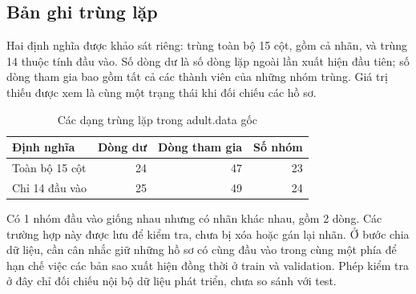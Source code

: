 \subsection{Bản ghi trùng lặp}
\label{subsec:3_3_2}
Hai định nghĩa được khảo sát riêng: trùng toàn bộ 15 cột, gồm cả nhãn, và trùng 14 thuộc tính đầu vào. Số dòng dư là số dòng lặp ngoài lần xuất hiện đầu tiên; số dòng tham gia bao gồm tất cả các thành viên của những nhóm trùng. Giá trị thiếu được xem là cùng một trạng thái khi đối chiếu các hồ sơ.

\begin{table}[htbp]
\centering
\small
\caption{Các dạng trùng lặp trong adult.data gốc}\label{tab:duplicates-train}
\begin{tabular}{lrrr}
\toprule
Định nghĩa & Dòng dư & Dòng tham gia & Số nhóm \\
\midrule
Toàn bộ 15 cột & 24 & 47 & 23 \\
Chỉ 14 đầu vào & 25 & 49 & 24 \\
\bottomrule
\end{tabular}
\end{table}

Có 1 nhóm đầu vào giống nhau nhưng có nhãn khác nhau, gồm 2 dòng. Các trường hợp này được lưu để kiểm tra, chưa bị xóa hoặc gán lại nhãn. Ở bước chia dữ liệu, cần cân nhắc giữ những hồ sơ có cùng đầu vào trong cùng một phía để hạn chế việc các bản sao xuất hiện đồng thời ở train và validation. Phép kiểm tra ở đây chỉ đối chiếu nội bộ dữ liệu phát triển, chưa so sánh với test.
